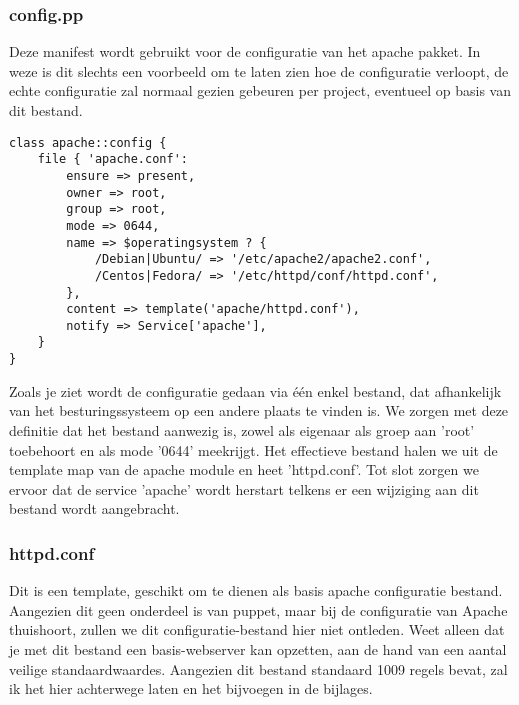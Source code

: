 \subsubsection{config.pp}
Deze manifest wordt gebruikt voor de configuratie van het apache pakket. In weze is dit slechts een voorbeeld om te laten zien hoe de configuratie verloopt, de echte configuratie zal normaal gezien gebeuren per project, eventueel op basis van dit bestand.
%
\begin{code}
\begin{lstlisting}
class apache::config {
	file { 'apache.conf':
		ensure => present,
		owner => root,
		group => root,
		mode => 0644,
		name => $operatingsystem ? {
			/Debian|Ubuntu/ => '/etc/apache2/apache2.conf',
			/Centos|Fedora/ => '/etc/httpd/conf/httpd.conf',
		},
		content => template('apache/httpd.conf'),
		notify => Service['apache'],
	}
}
\end{lstlisting}
\end{code}
%
Zoals je ziet wordt de configuratie gedaan via \'e\'en enkel bestand, dat afhankelijk van het besturingssysteem op een andere plaats te vinden is. We zorgen met deze definitie dat het bestand aanwezig is, zowel als eigenaar als groep aan 'root' toebehoort en als mode '0644' meekrijgt. Het effectieve bestand halen we uit de template map van de apache module en heet 'httpd.conf'. Tot slot zorgen we ervoor dat de service 'apache' wordt herstart telkens er een wijziging aan dit bestand wordt aangebracht.
%
\subsubsection{httpd.conf}
Dit is een template, geschikt om te dienen als basis apache configuratie bestand. Aangezien dit geen onderdeel is van puppet, maar bij de configuratie van Apache thuishoort, zullen we dit configuratie-bestand hier niet ontleden. Weet alleen dat je met dit bestand een basis-webserver kan opzetten, aan de hand van een aantal veilige standaardwaardes. Aangezien dit bestand standaard 1009 regels bevat, zal ik het hier achterwege laten en het bijvoegen in de bijlages.
